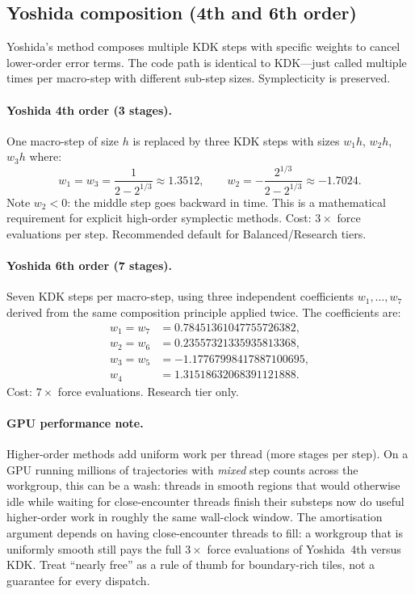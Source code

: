 \documentclass[11pt]{report}
\begin{document}
\subsection{Yoshida composition (4th and 6th order)}
\label{sec:yoshida}

Yoshida's method composes multiple KDK steps with specific weights to cancel lower-order error terms. The code path is identical to KDK---just called multiple times per macro-step with different sub-step sizes. Symplecticity is preserved.

\paragraph{Yoshida 4th order (3 stages).} One macro-step of size $h$ is replaced by three KDK steps with sizes $w_1h$, $w_2h$, $w_3h$ where:
\[
\boxed{w_1=w_3=\frac{1}{2-2^{1/3}}\approx 1.3512,\qquad w_2=-\frac{2^{1/3}}{2-2^{1/3}}\approx -1.7024.}
\]
Note $w_2<0$: the middle step goes backward in time. This is a mathematical requirement for explicit high-order symplectic methods. Cost: $3\times$ force evaluations per step. Recommended default for Balanced/Research tiers.

\paragraph{Yoshida 6th order (7 stages).} Seven KDK steps per macro-step, using three independent coefficients $w_1,\ldots,w_7$ derived from the same composition principle applied twice. The coefficients are:
\begin{align*}
w_1=w_7 &= 0.78451361047755726382,\\
w_2=w_6 &= 0.23557321335935813368,\\
w_3=w_5 &= -1.17767998417887100695,\\
w_4 &= 1.31518632068391121888.
\end{align*}
Cost: $7\times$ force evaluations. Research tier only.

\paragraph{GPU performance note.} Higher-order methods add uniform work per thread (more stages per step). On a GPU running millions of trajectories with \emph{mixed} step counts across the workgroup, this can be a wash: threads in smooth regions that would otherwise idle while waiting for close-encounter threads finish their substeps now do useful higher-order work in roughly the same wall-clock window. The amortisation argument depends on having close-encounter threads to fill: a workgroup that is uniformly smooth still pays the full $3\times$ force evaluations of Yoshida~4th versus KDK. Treat ``nearly free'' as a rule of thumb for boundary-rich tiles, not a guarantee for every dispatch.
\end{document}
